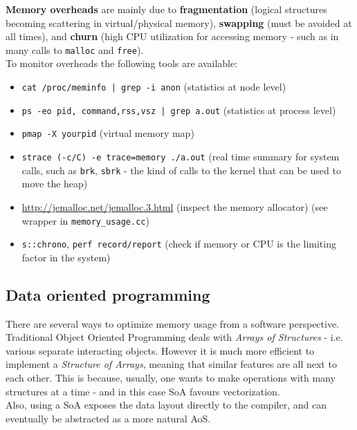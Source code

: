\documentclass[../template.tex]{subfiles}
\begin{document}
\textbf{Memory overheads} are mainly due to \textbf{fragmentation} (logical structures becoming scattering in virtual/physical memory), \textbf{swapping} (must be avoided at all times), and \textbf{churn} (high CPU utilization for accessing memory - such as in many calls to \texttt{malloc} and \texttt{free}).\\
To monitor overheads the following tools are available:
\begin{itemize}
    \item \texttt{cat /proc/meminfo | grep -i anon} (statistics at node level)
    \item \texttt{ps -eo pid, command,rss,vsz | grep a.out} (statistics at process level)
    \item \texttt{pmap -X yourpid} (virtual memory map)
    \item \texttt{strace (-c/C) -e trace=memory ./a.out} (real time summary for system calls, such as \texttt{brk}, \texttt{sbrk} - the kind of calls to the kernel that can be used to move the heap)
    \item \url{http://jemalloc.net/jemalloc.3.html} (inspect the memory allocator) (see wrapper in \texttt{memory\_usage.cc})
    \item \texttt{s::chrono}, \texttt{perf record/report} (check if memory or CPU is the limiting factor in the system)
\end{itemize}

\subsection{Data oriented programming}
There are several ways to optimize memory usage from a software perspective.\\
Traditional Object Oriented Programming deals with \textit{Arrays of Structures} - i.e. various separate interacting objects. However it is much more efficient to implement a \textit{Structure of Arrays}, meaning that similar features are all next to each other. This is because, usually, one wants to make operations with many structures at a time - and in this case SoA favours vectorization.\\
Also, using a SoA exposes the data layout directly to the compiler, and can eventually be abstracted as a more natural AoS.  


    
\end{document}
